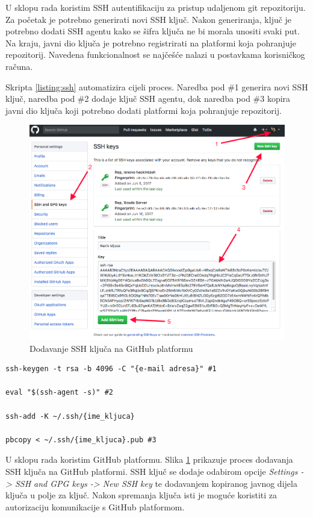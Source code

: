 \documentclass[times, utf8, diplomski, numeric]{fer}
\begin{document}
\begin{appendices}
U sklopu rada koristim SSH autentifikaciju za pristup udaljenom git repozitoriju. Za početak je potrebno generirati novi SSH ključ. Nakon generiranja, ključ je potrebno dodati SSH agentu kako se šifra ključa ne bi morala unositi svaki put. Na kraju, javni dio ključa je potrebno registrirati na platformi koja pohranjuje repozitorij. Navedena funkcionalnost se najčešće nalazi u postavkama korisničkog računa.

Skripta \ref{listing:ssh} automatizira cijeli proces. Naredba pod \#1 generira novi SSH ključ, naredba pod \#2 dodaje ključ SSH agentu, dok naredba pod \#3 kopira javni dio ključa koji potrebno dodati platformi koja pohranjuje repozitorij.

\begin{figure}[b!]
\centering
\includegraphics[scale=0.4]{GitHubSSH}
\caption{Dodavanje SSH ključa na GitHub platformu}
\label{fig:GitHubSSH}
\end{figure}

\begin{lstlisting}[caption=Postavljanje SSH autentifikacije, label=listing:ssh]
ssh-keygen -t rsa -b 4096 -C "{e-mail adresa}" #1

eval "$(ssh-agent -s)" #2

ssh-add -K ~/.ssh/{ime_kljuca}

pbcopy < ~/.ssh/{ime_kljuca}.pub #3
\end{lstlisting}

U sklopu rada koristim GitHub platformu. Slika \ref{fig:GitHubSSH} prikazuje proces dodavanja SSH ključa na GitHub platformi. SSH ključ se dodaje odabirom opcije \textit{Settings -> SSH and GPG keys -> New SSH key} te dodavanjem kopiranog javnog dijela ključa u polje za ključ. Nakon spremanja ključa isti je moguće koristiti za autorizaciju komunikacije s GitHub platformom.


\end{appendices}
\end{document}
